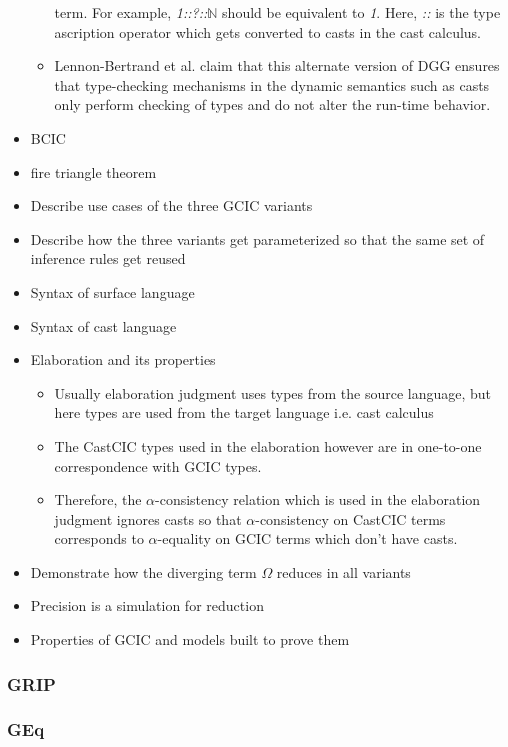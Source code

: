 \documentclass{article}
\newcommand{\Gcode}[1]{{\color{OliveGreen}\textit{#1}}}
\newcommand{\Ccode}[1]{{\color{BlueViolet}\textbf{#1}}}
\begin{document}
\begin{itemize}
\begin{itemize}
        term. For example, \Gcode{1::?::\(\mathbb{N}\)} should be equivalent to
        \Gcode{1}. Here, \Gcode{::} is the type ascription operator which gets
        converted to casts in the cast calculus.
      \item Lennon-Bertrand et al. claim that this alternate version of DGG ensures
        that type-checking mechanisms in the dynamic semantics such as casts only
        perform checking of types and do not alter the run-time behavior.
    \end{itemize}
  \item BCIC
  \item fire triangle theorem
  \item Describe use cases of the three GCIC variants
  \item Describe how the three variants get parameterized so that the same set
    of inference rules get reused
  \item Syntax of surface language
  \item Syntax of cast language
  \item Elaboration and its properties
    \begin{itemize}
      \item Usually elaboration judgment uses types from the source language,
        but here types are used from the target language i.e. cast calculus
      \item The CastCIC types used in the elaboration however are in one-to-one
        correspondence with GCIC types.
      \item Therefore, the \(\alpha\)-consistency relation which is used in the
        elaboration judgment ignores casts so that \(\alpha\)-consistency on
        CastCIC terms corresponds to \(\alpha\)-equality on GCIC terms which
        don't have casts.
    \end{itemize}
  \item Demonstrate how the diverging term \Ccode{\(\Omega\)} reduces in all
    variants
  \item Precision is a simulation for reduction
  \item Properties of GCIC and models built to prove them
\end{itemize}

\subsubsection{GRIP}
\subsubsection{GEq}
\end{document}
